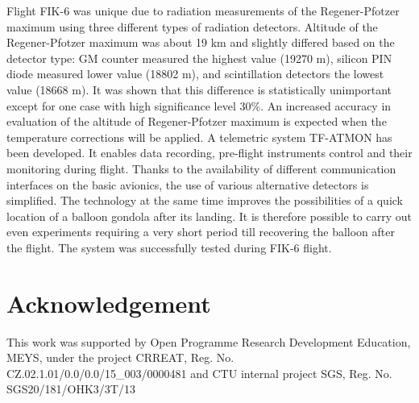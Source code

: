 \documentclass{Rpd}
\begin{document}
Flight FIK-6 was unique due to radiation measurements of the Regener-Pfotzer maximum using three different types of radiation detectors. Altitude of the Regener-Pfotzer maximum was about 19 km and slightly differed based on the detector type: GM counter measured the highest value (19270 m), silicon PIN diode measured lower value (18802 m), and scintillation detectors the lowest value (18668 m). It was shown that this difference is statistically unimportant except for one case with high significance level 30\%. An increased accuracy in evaluation of the altitude of Regener-Pfotzer maximum is expected when the temperature corrections will be applied.
A telemetric system TF-ATMON has been developed. It enables data recording, pre-flight instruments control and their monitoring during flight. Thanks to the availability of different communication interfaces on the basic avionics, the use of various alternative detectors is simplified. The technology at the same time improves the possibilities of a quick location of a balloon gondola after its landing. It is therefore possible to carry out even experiments requiring a very short period till recovering the balloon after the flight. The system was successfully tested during FIK-6 flight.

\section*{Acknowledgement}

This work was supported by Open Programme Research Development Education, MEYS, under the project CRREAT, \newline Reg. No. CZ.02.1.01/0.0/0.0/15\_003/0000481 and CTU internal project SGS, Reg. No. SGS20/181/OHK3/3T/13
\end{document}
